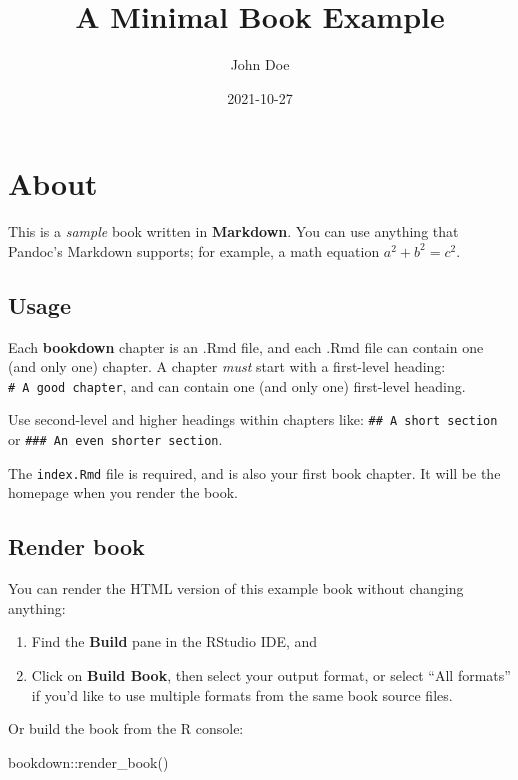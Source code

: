 \documentclass[
]{book}
\title{A Minimal Book Example}
\author{John Doe}
\date{2021-10-27}
\newenvironment{Shaded}{\begin{snugshade}}{\end{snugshade}}
\newcommand{\FunctionTok}[1]{\textcolor[rgb]{0.00,0.00,0.00}{#1}}
\newcommand{\NormalTok}[1]{#1}
\newcommand{\SpecialCharTok}[1]{\textcolor[rgb]{0.00,0.00,0.00}{#1}}
\theoremstyle{definition}
\theoremstyle{definition}
\theoremstyle{definition}
\theoremstyle{definition}
\theoremstyle{remark}
\begin{document}
\maketitle

{
\setcounter{tocdepth}{1}
\tableofcontents
}
\hypertarget{about}{%
\chapter{About}\label{about}}

This is a \emph{sample} book written in \textbf{Markdown}. You can use anything that Pandoc's Markdown supports; for example, a math equation \(a^2 + b^2 = c^2\).

\hypertarget{usage}{%
\section{Usage}\label{usage}}

Each \textbf{bookdown} chapter is an .Rmd file, and each .Rmd file can contain one (and only one) chapter. A chapter \emph{must} start with a first-level heading: \texttt{\#\ A\ good\ chapter}, and can contain one (and only one) first-level heading.

Use second-level and higher headings within chapters like: \texttt{\#\#\ A\ short\ section} or \texttt{\#\#\#\ An\ even\ shorter\ section}.

The \texttt{index.Rmd} file is required, and is also your first book chapter. It will be the homepage when you render the book.

\hypertarget{render-book}{%
\section{Render book}\label{render-book}}

You can render the HTML version of this example book without changing anything:

\begin{enumerate}
\def\labelenumi{\arabic{enumi}.}
\item
  Find the \textbf{Build} pane in the RStudio IDE, and
\item
  Click on \textbf{Build Book}, then select your output format, or select ``All formats'' if you'd like to use multiple formats from the same book source files.
\end{enumerate}

Or build the book from the R console:

\begin{Shaded}
\begin{Highlighting}[]
\NormalTok{bookdown}\SpecialCharTok{::}\FunctionTok{render\_book}\NormalTok{()}
\end{Highlighting}
\end{Shaded}
\end{document}
